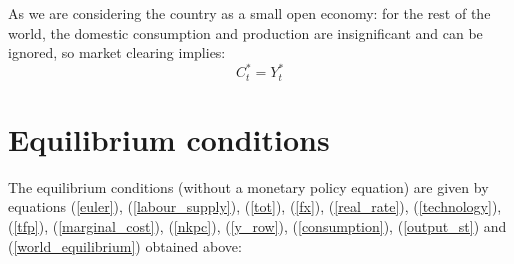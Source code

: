 \documentclass{article}
\begin{document}
As we are considering the country as a small open economy: for the rest of the world, the domestic consumption and production are insignificant and can be ignored, so market clearing implies:
\begin{equation}
    \label{world_equilibrium}
    C_t^* = Y_t^*
\end{equation}

\section{Equilibrium conditions}
The equilibrium conditions (without a monetary policy equation) are given by equations (\ref{euler}), (\ref{labour_supply}), (\ref{tot}), (\ref{fx}), (\ref{real_rate}), (\ref{technology}), (\ref{tfp}), (\ref{marginal_cost}), (\ref{nkpc}), (\ref{y_row}), (\ref{consumption}), (\ref{output_st}) and (\ref{world_equilibrium}) obtained above:
\end{document}
